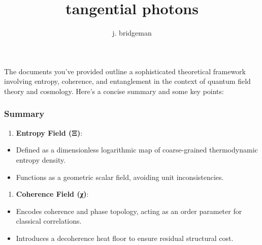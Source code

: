 \documentclass[
]{article}
\title{tangential photons}
\author{j. bridgeman}
\date{}
\providecommand{\tightlist}{%
  \setlength{\itemsep}{0pt}\setlength{\parskip}{0pt}}
\begin{document}
\maketitle

The documents you've provided outline a sophisticated theoretical
framework involving entropy, coherence, and entanglement in the context
of quantum field theory and cosmology. Here's a concise summary and some
key points:

\hypertarget{summary}{%
\subsubsection{Summary}\label{summary}}

\begin{enumerate}
\def\labelenumi{\arabic{enumi}.}
\tightlist
\item
  \textbf{Entropy Field (Ξ)}:
\end{enumerate}

\begin{itemize}
\tightlist
\item
  Defined as a dimensionless logarithmic map of coarse-grained
  thermodynamic entropy density.
\item
  Functions as a geometric scalar field, avoiding unit inconsistencies.
\end{itemize}

\begin{enumerate}
\def\labelenumi{\arabic{enumi}.}
\setcounter{enumi}{1}
\tightlist
\item
  \textbf{Coherence Field (χ)}:
\end{enumerate}

\begin{itemize}
\tightlist
\item
  Encodes coherence and phase topology, acting as an order parameter for
  classical correlations.
\item
  Introduces a decoherence heat floor to ensure residual structural
  cost.
\end{itemize}
\end{document}
